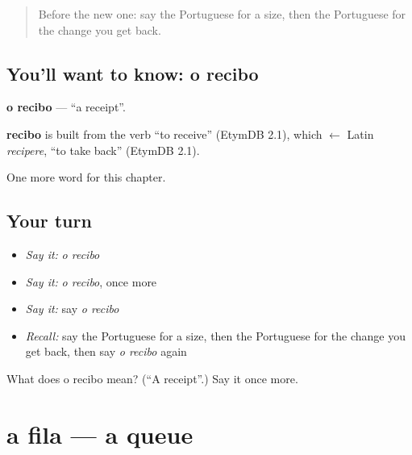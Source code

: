 \label{lesson:PT-C253-recibo}



\begin{quote}
Before the new one: say the Portuguese for a size, then the Portuguese for the change you get back.
\end{quote}

\subsection*{You'll want to know: o recibo}
\textbf{o recibo} — \textquotedblleft{}a receipt\textquotedblright{}.

\begin{cousinweb}
\textbf{recibo} is built from the verb \textquotedblleft{}to receive\textquotedblright{} (EtymDB 2.1), which $\leftarrow$ Latin \emph{recipere}, \textquotedblleft{}to take back\textquotedblright{} (EtymDB 2.1).
\end{cousinweb}

\begin{grammarlens}[title={What you've built}]
One more word for this chapter.
\end{grammarlens}

\subsection*{Your turn}
\begin{itemize}
\raggedright
  \item \emph{Say it:} \emph{o recibo}
  \item \emph{Say it:} \emph{o recibo}, once more
  \item \emph{Say it:} say \emph{o recibo}
  \item \emph{Recall:} say the Portuguese for a size, then the Portuguese for the change you get back, then say \emph{o recibo} again
\end{itemize}

\begin{tcolorbox}[breakable,colback=teal!4,colframe=teal!35!black,title={Before you move on}]
What does o recibo mean? (\textquotedblleft{}A receipt\textquotedblright{}.) Say it once more.
\end{tcolorbox}
\section[a fila]{a fila — a queue}

\label{lesson:PT-C253-fila}



